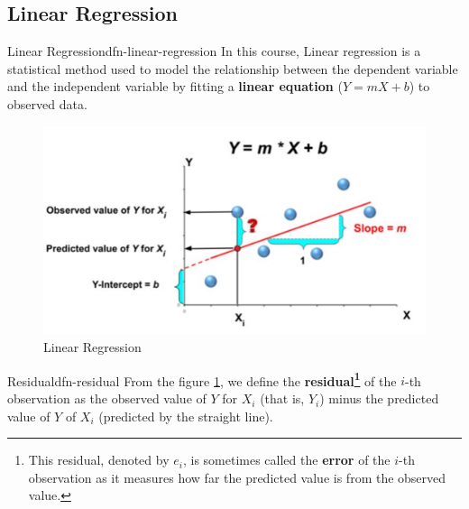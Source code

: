 \documentclass[math,code]{amznotes}
\theoremstyle{remark}
\begin{document}
\subsection{Linear Regression}
\begin{dfnbox}{Linear Regression}{dfn-linear-regression}
    In this course, {\color{red} Linear regression} is a statistical method used to model the relationship between the dependent variable and the independent variable by fitting a \textbf{linear equation} ($Y=mX+b$) to observed data.
\end{dfnbox}
\begin{figure}[H]
    \centering
    \includegraphics[width=0.5\linewidth]{images/chapter3-linear-regression.png}
    \caption{Linear Regression}
    \label{fig:chapter3-linear-regression}
\end{figure}
\begin{dfnbox}{Residual}{dfn-residual}
    From the figure \ref{fig:chapter3-linear-regression}, we define the {\color{red} \textbf{residual\footnote{This residual, denoted by $e_i$, is sometimes called the \textbf{error} of the $i$-th observation as it measures how far the predicted value is from the observed value.}}} of the $i$-th observation as the observed value of $Y$ for $X_i$ (that is, $Y_i$) minus the predicted value of $Y$ of $X_i$ (predicted by the straight line).
\end{dfnbox}
\end{document}
